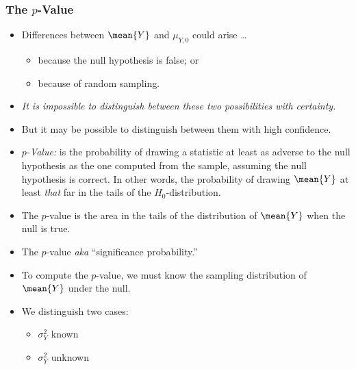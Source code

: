\begin{frame}
\frametitle{The $p$-Value}
\begin{itemize}
\item Differences between $\mean{Y}$ and $\mu_{Y,0}$ could arise \ldots
\begin{itemize}
\item because the null hypothesis is false; or
\item because of random sampling. 
\end{itemize}
\item \emph{It is impossible to distinguish between these two possibilities with certainty.}
\item But it may be possible to distinguish between them with high confidence.
\item \emph{$p$-Value:} is the probability of drawing a statistic at least as adverse to the null hypothesis as the one computed from the sample, assuming the null hypothesis is correct. In other words, the probability of drawing $\mean{Y}$ at least \textit{that} far in the tails of the $H_0$-distribution. 
\item The $p$-value is the area in the tails of the distribution of $\mean{Y}$ when the null is true.
\item The $p$-value \textit{aka} ``significance probability.'' 
\item To compute the $p$-value, we must know the sampling distribution of $\mean{Y}$ under the null. 
\item We distinguish two cases: 
\begin{itemize}
\item $\sigma^2_{Y}$ known
\item $\sigma^2_{Y}$ unknown
\end{itemize}
\end{itemize}
\end{frame}


